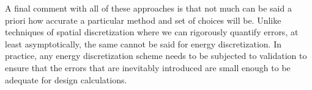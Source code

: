 A final comment with all of these approaches is that not much can be said a priori how accurate a particular method and set of choices will be. Unlike techniques of spatial discretization where we can rigorously quantify errors, at least asymptotically, the same cannot be said for energy discretization. In practice, any energy discretization scheme needs to be subjected to validation to ensure that the errors that are inevitably introduced are small enough to be adequate for design calculations.

